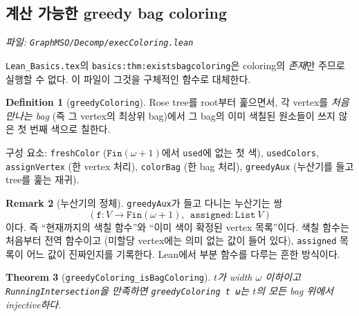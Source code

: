 \documentclass[11pt]{article}
\theoremstyle{definition}
\newtheorem{definition}{Definition}[section]
\newtheorem{remark}[definition]{Remark}
\theoremstyle{plain}
\newtheorem{theorem}[definition]{Theorem}
\newcommand{\lean}[1]{\texttt{#1}}
\newcommand{\leanfile}[1]{\texttt{#1}}
\begin{document}
\subsection{계산 가능한 greedy bag coloring}

\emph{파일: \leanfile{GraphMSO/Decomp/execColoring.lean}}

\leanfile{Lean\_Basics.tex}의 \lean{basics:thm:existsbagcoloring}은 coloring의
\emph{존재}만 주므로 실행할 수 없다. 이 파일이 그것을 구체적인 함수로 대체한다.

\begin{definition}[\lean{greedyColoring}]
\label{nice:def:greedycoloring}
Rose tree를 root부터 훑으면서, 각 vertex를 \emph{처음 만나는 bag} (즉 그
vertex의 최상위 bag)에서 그 bag의 이미 색칠된 원소들이 쓰지 않은 첫 번째 색으로
칠한다.

구성 요소: \lean{freshColor} ($\lean{Fin}(\omega+1)$에서 \lean{used}에 없는 첫
색), \lean{usedColors}, \lean{assignVertex} (한 vertex 처리),
\lean{colorBag} (한 bag 처리), \lean{greedyAux} (누산기를 들고 tree를 훑는
재귀).
\end{definition}

\begin{remark}[누산기의 정체]
\label{nice:rem:accumulator}
\lean{greedyAux}가 들고 다니는 누산기는 쌍
\[
  (\lean{f} : V \to \lean{Fin}(\omega+1),\ \ \lean{assigned} : \lean{List}\ V)
\]
이다. 즉 ``현재까지의 색칠 함수''와 ``이미 색이 확정된 vertex 목록''이다.
색칠 함수는 처음부터 전역 함수이고 (미할당 vertex에는 의미 없는 값이 들어
있다), \lean{assigned} 목록이 어느 값이 진짜인지를 기록한다. Lean에서 부분
함수를 다루는 흔한 방식이다.
\end{remark}

\begin{theorem}[\lean{greedyColoring\_isBagColoring}]
\label{nice:thm:greedycorrect}
$t$가 width $\omega$ 이하이고 \lean{RunningIntersection}을 만족하면
\lean{greedyColoring t ω}는 $t$의 모든 bag 위에서 injective하다.
\end{theorem}
\end{document}
